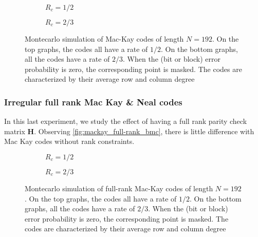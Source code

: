 \begin{figure}
    \centering
    \begin{subfigure}{\textwidth}
        \centering
        
        \caption{$R_c = 1/2$}
    \end{subfigure}%

    \begin{subfigure}{\textwidth}
        \centering
        
        \caption{$R_c = 2/3$}
    \end{subfigure}%
    \caption[Montecarlo simulation of Mac-Kay codes of length $N = 192$]{%
        Montecarlo simulation of Mac-Kay codes of length $N = 192$. On the top
        graphs, the codes all have a rate of $1/2$. On the bottom graphs, all
        the codes have a rate of $2/3$. When the (bit or block) error
        probability is zero, the corresponding point is masked. The codes are
        characterized by their average row and column degree%
    }
    \label{fig:mackay_bmc}
\end{figure}


\subsubsection{Irregular full rank Mac Kay \& Neal codes}
In this last experiment, we study the effect of having a full rank parity check
matrix $\bm{H}$. Observing \autoref{fig:mackay_full-rank_bmc}, there is little
difference with Mac Kay codes without rank constraints.

\begin{figure}
    \centering
    \begin{subfigure}{\textwidth}
        \centering
        
        \caption{$R_c = 1/2$}
    \end{subfigure}%

    \begin{subfigure}{\textwidth}
        \centering
        
        \caption{$R_c = 2/3$}
    \end{subfigure}%
    \caption[Montecarlo simulation of full-rank Mac-Kay codes of length $N = 192$]{%
        Montecarlo simulation of full-rank Mac-Kay codes of length $N = 192$. On the top
        graphs, the codes all have a rate of $1/2$. On the bottom graphs, all
        the codes have a rate of $2/3$. When the (bit or block) error
        probability is zero, the corresponding point is masked. The codes are
        characterized by their average row and column degree%
    }
    \label{fig:mackay_full-rank_bmc}
\end{figure}
